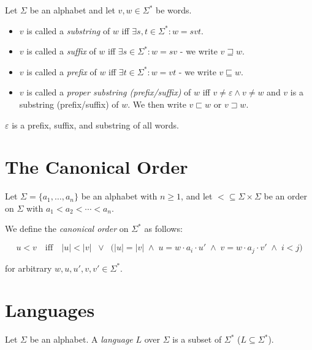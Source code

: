 Let \(\Sigma\) be an alphabet and let \(v, w \in \Sigma^{*}\) be words.  

\begin{itemize}

    \item \(v\) is called a \emph{substring} of \(w\) iff \(\exists s, t \in \Sigma^{*} : w = s v t\).  

    \item \(v\) is called a \emph{suffix} of \(w\) iff \(\exists s \in \Sigma^{*} : w = s v\) - we write \(v \sqsupseteq w\).  

    \item \(v\) is called a \emph{prefix} of \(w\) iff \(\exists t \in \Sigma^{*} : w = v t\) - we write \(v \sqsubseteq w\).  

    \item \(v\) is called a \emph{proper substring (prefix/suffix)} of \(w\) iff \(v \neq \varepsilon \wedge v \neq w\) and \(v\) is a substring (prefix/suffix) of \(w\).  
    We then write \(v \sqsubset w\) or \(v \sqsupset w\).  

\end{itemize}

\(\varepsilon\) is a prefix, suffix, and substring of all words. 

\section{The Canonical Order}

Let \(\Sigma = \{a_{1}, \dots, a_{n}\}\) be an alphabet with \(n \geq 1\), and let 
\(< \subseteq \Sigma \times \Sigma\) be an order on \(\Sigma\) with
\(a_{1} < a_{2} < \cdots < a_{n}\).  

We define the \emph{canonical order} on \(\Sigma^{*}\) as follows:  

\[
    u < v 
    \quad \text{iff} \quad 
    \lvert u \rvert < \lvert v \rvert 
    \;\;\vee\;\; 
    \bigl(\lvert u \rvert = \lvert v \rvert \;\wedge\; 
    u = w \cdot a_{i} \cdot u' \;\wedge\; v = w \cdot a_{j} \cdot v' 
    \;\wedge\; i < j \bigr)
\]

for arbitrary \(w, u, u', v, v' \in \Sigma^{*}\).  

\section{Languages}

Let \(\Sigma\) be an alphabet. A \emph{language} \(L\) over \(\Sigma\) is a subset of \(\Sigma^{*}\) (\(L \subseteq \Sigma^{*}\)).  

